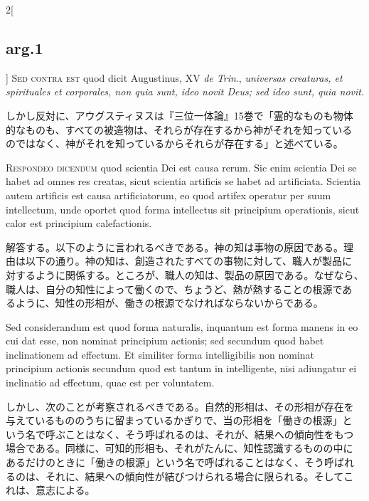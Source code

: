 \documentclass[paper=a4paper,fontsize=10pt,jafontsize=9pt,titlepage]{jlreq}
\begin{document}
\begin{paracol}{2}[\subsection{arg.1}]
{\scshape Sed contra est} quod dicit Augustinus, XV {\itshape de
Trin}., {\itshape universas creaturas, et spirituales et corporales,
non quia sunt, ideo novit Deus; sed ideo sunt, quia novit}.

\switchcolumn

しかし反対に、アウグスティヌスは『三位一体論』15巻で「霊的なものも物体
的なものも、すべての被造物は、それらが存在するから神がそれを知っている
のではなく、神がそれを知っているからそれらが存在する」と述べている。


{\scshape Respondeo dicendum} quod scientia Dei est causa rerum. Sic
enim scientia Dei se habet ad omnes res creatas, sicut scientia
artificis se habet ad artificiata. Scientia autem artificis est causa
artificiatorum, eo quod artifex operatur per suum intellectum, unde
oportet quod forma intellectus sit principium operationis, sicut calor
est principium calefactionis.

\switchcolumn

解答する。以下のように言われるべきである。神の知は事物の原因である。理
由は以下の通り。神の知は、創造されたすべての事物に対して、職人が製品に
対するように関係する。ところが、職人の知は、製品の原因である。なぜなら、
職人は、自分の知性によって働くので、ちょうど、熱が熱することの根源であ
るように、知性の形相が、働きの根源でなければならないからである。

\switchcolumn*

Sed considerandum est quod forma naturalis, inquantum est forma manens
in eo cui dat esse, non nominat principium actionis; sed secundum quod
habet inclinationem ad effectum. Et similiter forma intelligibilis non
nominat principium actionis secundum quod est tantum in intelligente,
nisi adiungatur ei inclinatio ad effectum, quae est per voluntatem.

\switchcolumn

しかし、次のことが考察されるべきである。自然的形相は、その形相が存在を
与えているもののうちに留まっているかぎりで、当の形相を「働きの根源」と
いう名で呼ぶことはなく、そう呼ばれるのは、それが、結果への傾向性をもつ
場合である。同様に、可知的形相も、それがたんに、知性認識するものの中に
あるだけのときに「働きの根源」という名で呼ばれることはなく、そう呼ばれ
るのは、それに、結果への傾向性が結びつけられる場合に限られる。そしてこ
れは、意志による。


\end{paracol}
\end{document}
